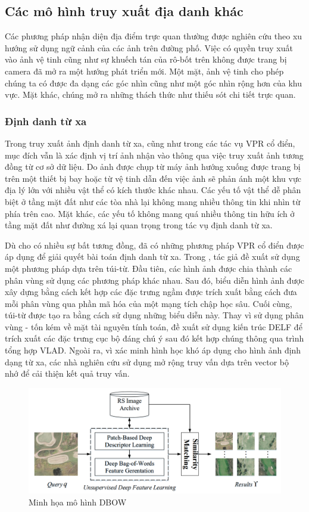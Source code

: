 \subsection{Các mô hình truy xuất địa danh khác}
Các phương pháp nhận diện địa điểm trực quan thường được nghiên cứu theo xu hướng sử dụng ngữ cảnh của các ảnh trên đường phố. Việc có quyền truy xuất vào ảnh vệ tinh cũng như sự khuếch tán của rô-bốt trên không được trang bị camera đã mở ra một hướng phát triển mới. Một mặt, ảnh vệ tinh cho phép chúng ta có được đa dạng các góc nhìn cũng như một góc nhìn rộng hơn của khu vực. Mặt khác, chúng mở ra những thách thức như thiếu sót chi tiết trực quan.

\subsubsection{Định danh từ xa}
Trong truy xuất ảnh định danh từ xa, cũng như trong các tác vụ VPR cổ điển, mục đích vẫn là xác định vị trí ảnh nhận vào thông qua việc truy xuất ảnh tương đồng từ cơ sở dữ liệu. Do ảnh được chụp từ máy ảnh hướng xuống được trang bị trên một thiết bị bay hoặc từ vệ tinh dẫn đến việc ảnh sẽ phản ánh một khu vực địa lý lớn với nhiều vật thể có kích thước khác nhau. Các yếu tố vật thể dễ phân biệt ở tầng mặt đất như các tòa nhà lại không mang nhiều thông tin khi nhìn từ phía trên cao. Mặt khác, các yếu tố không mang quá nhiều thông tin hữu ích ở tầng mặt đất như đường xá lại quan trọng trong tác vụ định danh từ xa.

Dù cho có nhiều sự bất tương đồng, đã có những phương pháp VPR cổ điển được áp dụng để giải quyết bài toán định danh từ xa. Trong \cite{Tang2018UnsupervisedDF}, tác giả đề xuất sử dụng một phương pháp dựa trên túi-từ. Đầu tiên, các hình ảnh được chia thành các phân vùng sử dụng các phương pháp khác nhau. Sau đó, biểu diễn hình ảnh được xây dựng bằng cách kết hợp các đặc trưng ngầm được trích xuất bằng cách đưa mỗi phân vùng qua phần mã hóa của một mạng tích chập học sâu. Cuối cùng, túi-từ được tạo ra bằng cách sử dụng những biểu diễn này. Thay vì sử dụng phân vùng - tốn kém về mặt tài nguyên tính toán, \cite{Imbriaco_2019} đề xuất sử dụng kiến trúc DELF để trích xuất các đặc trưng cục bộ đáng chú ý sau đó kết hợp chúng thông qua trình tổng hợp VLAD. Ngoài ra, vì xác minh hình học khó áp dụng cho hình ảnh định dạng từ xa, các nhà nghiên cứu sử dụng mở rộng truy vấn dựa trên vector bộ nhớ \cite{7870636} để cải thiện kết quả truy vấn.

\begin{figure}[H]
    \centering
    \includegraphics[width=\textwidth]{pics/Chapter2/rsir.png}
    \caption{Minh họa mô hình DBOW \cite{Tang2018UnsupervisedDF}}
\end{figure}

